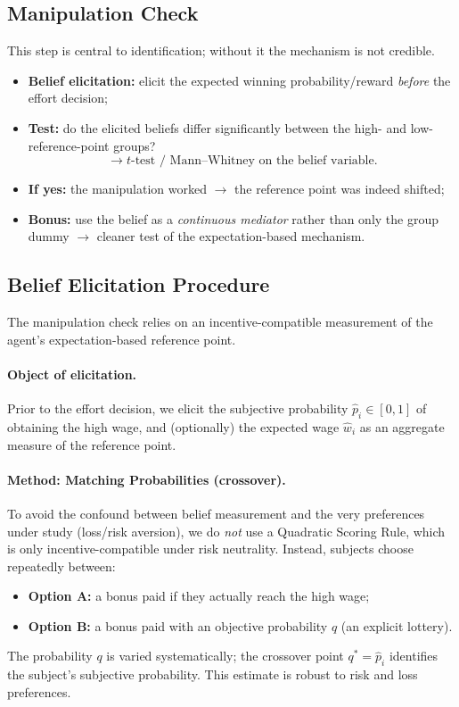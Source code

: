 \documentclass[
    11pt,
    a4paper,
    parskip=half,
    headings=normal
]{scrartcl}
\numberwithin{equation}{section}
\theoremstyle{definition}
\theoremstyle{remark}
\begin{document}
\subsection{Manipulation Check}
This step is central to identification; without it the mechanism is not credible.
\begin{itemize}
    \item \textbf{Belief elicitation:} elicit the expected winning probability/reward \emph{before} the effort decision;
    \item \textbf{Test:} do the elicited beliefs differ significantly between the high- and low-reference-point groups?
    \[
        \rightarrow \text{$t$-test / Mann--Whitney on the belief variable.}
    \]
    \item \textbf{If yes:} the manipulation worked $\rightarrow$ the reference point was indeed shifted;
    \item \textbf{Bonus:} use the belief as a \emph{continuous mediator} rather than only the group dummy $\rightarrow$ cleaner test of the expectation-based mechanism.
\end{itemize}
\subsection{Belief Elicitation Procedure}
The manipulation check relies on an incentive-compatible measurement of the
agent's expectation-based reference point.

\paragraph{Object of elicitation.}
Prior to the effort decision, we elicit the subjective probability
$\hat{p}_i \in [0,1]$ of obtaining the high wage, and (optionally) the
expected wage $\hat{w}_i$ as an aggregate measure of the reference point.

\paragraph{Method: Matching Probabilities (crossover).}
To avoid the confound between belief measurement and the very preferences
under study (loss/risk aversion), we do \emph{not} use a Quadratic Scoring
Rule, which is only incentive-compatible under risk neutrality. Instead,
subjects choose repeatedly between:
\begin{itemize}
    \item \textbf{Option A:} a bonus paid if they actually reach the high wage;
    \item \textbf{Option B:} a bonus paid with an objective probability $q$
    (an explicit lottery).
\end{itemize}
The probability $q$ is varied systematically; the crossover point
$q^\ast = \hat{p}_i$ identifies the subject's subjective probability.
This estimate is robust to risk and loss preferences.
\end{document}
